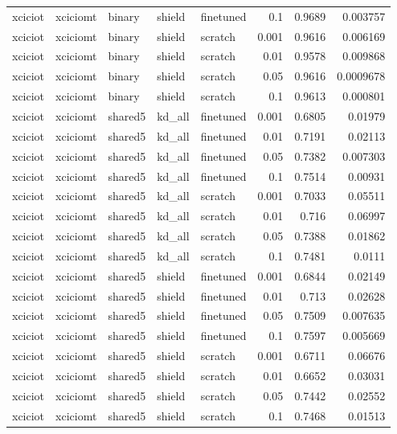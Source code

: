 \begin{table}
\begin{tabular}{lllllrrr}
xciciot & xciciomt & binary & shield & finetuned & 0.1 & 0.9689 & 0.003757 \\
xciciot & xciciomt & binary & shield & scratch & 0.001 & 0.9616 & 0.006169 \\
xciciot & xciciomt & binary & shield & scratch & 0.01 & 0.9578 & 0.009868 \\
xciciot & xciciomt & binary & shield & scratch & 0.05 & 0.9616 & 0.0009678 \\
xciciot & xciciomt & binary & shield & scratch & 0.1 & 0.9613 & 0.000801 \\
xciciot & xciciomt & shared5 & kd_all & finetuned & 0.001 & 0.6805 & 0.01979 \\
xciciot & xciciomt & shared5 & kd_all & finetuned & 0.01 & 0.7191 & 0.02113 \\
xciciot & xciciomt & shared5 & kd_all & finetuned & 0.05 & 0.7382 & 0.007303 \\
xciciot & xciciomt & shared5 & kd_all & finetuned & 0.1 & 0.7514 & 0.00931 \\
xciciot & xciciomt & shared5 & kd_all & scratch & 0.001 & 0.7033 & 0.05511 \\
xciciot & xciciomt & shared5 & kd_all & scratch & 0.01 & 0.716 & 0.06997 \\
xciciot & xciciomt & shared5 & kd_all & scratch & 0.05 & 0.7388 & 0.01862 \\
xciciot & xciciomt & shared5 & kd_all & scratch & 0.1 & 0.7481 & 0.0111 \\
xciciot & xciciomt & shared5 & shield & finetuned & 0.001 & 0.6844 & 0.02149 \\
xciciot & xciciomt & shared5 & shield & finetuned & 0.01 & 0.713 & 0.02628 \\
xciciot & xciciomt & shared5 & shield & finetuned & 0.05 & 0.7509 & 0.007635 \\
xciciot & xciciomt & shared5 & shield & finetuned & 0.1 & 0.7597 & 0.005669 \\
xciciot & xciciomt & shared5 & shield & scratch & 0.001 & 0.6711 & 0.06676 \\
xciciot & xciciomt & shared5 & shield & scratch & 0.01 & 0.6652 & 0.03031 \\
xciciot & xciciomt & shared5 & shield & scratch & 0.05 & 0.7442 & 0.02552 \\
xciciot & xciciomt & shared5 & shield & scratch & 0.1 & 0.7468 & 0.01513 \\
\bottomrule
\end{tabular}
\end{table}

